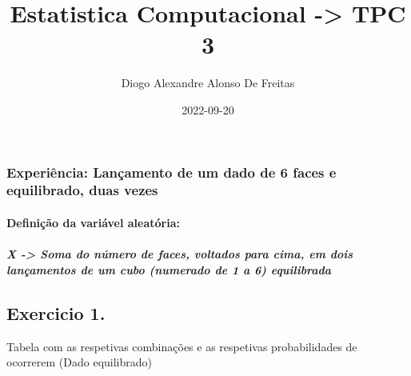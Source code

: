 \documentclass[
]{article}
\title{Estatistica Computacional -\textgreater{} TPC 3}
\author{Diogo Alexandre Alonso De Freitas}
\date{2022-09-20}
\newenvironment{Shaded}{\begin{snugshade}}{\end{snugshade}}
\newcommand{\AttributeTok}[1]{\textcolor[rgb]{0.77,0.63,0.00}{#1}}
\newcommand{\DecValTok}[1]{\textcolor[rgb]{0.00,0.00,0.81}{#1}}
\newcommand{\FunctionTok}[1]{\textcolor[rgb]{0.00,0.00,0.00}{#1}}
\newcommand{\NormalTok}[1]{#1}
\newcommand{\OtherTok}[1]{\textcolor[rgb]{0.56,0.35,0.01}{#1}}
\newcommand{\SpecialCharTok}[1]{\textcolor[rgb]{0.00,0.00,0.00}{#1}}
\newcommand{\StringTok}[1]{\textcolor[rgb]{0.31,0.60,0.02}{#1}}
\begin{document}
\maketitle

\hypertarget{experiuxeancia-lanuxe7amento-de-um-dado-de-6-faces-e-equilibrado-duas-vezes}{%
\subsubsection{Experiência: Lançamento de um dado de 6 faces e
equilibrado, duas
vezes}\label{experiuxeancia-lanuxe7amento-de-um-dado-de-6-faces-e-equilibrado-duas-vezes}}

\hypertarget{definiuxe7uxe3o-da-variuxe1vel-aleatuxf3ria}{%
\paragraph{Definição da variável
aleatória:}\label{definiuxe7uxe3o-da-variuxe1vel-aleatuxf3ria}}

\hypertarget{x---soma-do-nuxfamero-de-faces-voltados-para-cima-em-dois-lanuxe7amentos-de-um-cubo-numerado-de-1-a-6-equilibrada}{%
\subparagraph{X -\textgreater{} Soma do número de faces, voltados para
cima, em dois lançamentos de um cubo (numerado de 1 a 6)
equilibrada}\label{x---soma-do-nuxfamero-de-faces-voltados-para-cima-em-dois-lanuxe7amentos-de-um-cubo-numerado-de-1-a-6-equilibrada}}

\hypertarget{exercicio-1.}{%
\subsection{Exercicio 1.}\label{exercicio-1.}}

Tabela com as respetivas combinações e as respetivas probabilidades de
ocorrerem (Dado equilibrado)

\begin{Shaded}
\end{Shaded}
\end{document}
